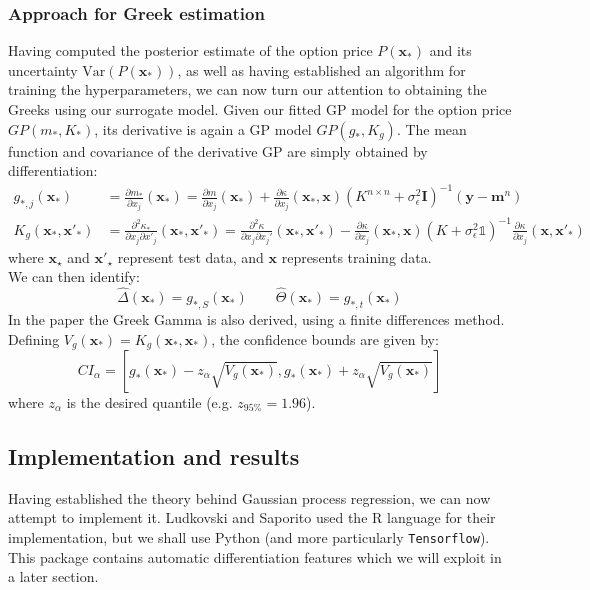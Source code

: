 \documentclass[a4paper,12pt]{article}
\begin{document}
\subsubsection{Approach for Greek estimation}
Having computed the posterior estimate of the option price $P(\mathbf{x}_*)$ and its uncertainty $\text{Var}(P(\mathbf{x}_*))$, as well as having established an algorithm for training the hyperparameters, we can now turn our attention to obtaining the Greeks using our surrogate model. Given our fitted GP model for the option price $GP(m_*,K_*)$, its derivative is again a GP model $GP(g_*,K_g)$. The mean function and covariance of the derivative GP are simply obtained by differentiation: 
\begin{equation}
\label{eq:greek_estimate}
\begin{aligned}
   g_{*,j}(\mathbf{x}_*) &= \frac{\partial m_*}{\partial x_j} (\mathbf{x}_*) = \frac{\partial m}{\partial x_j} (\mathbf{x}_*) + \frac{\partial \kappa}{\partial x_j}(\mathbf{x}_*,\mathbf{x})(K^{n \times n}+\sigma^2_{\epsilon}\textbf{I})^{-1}(\mathbf{y}-\mathbf{m}^n)\\
   K_g(\mathbf{x}_*,\mathbf{x}'_*) &= \frac{\partial^2 \kappa_*}{\partial x_j \partial x'_j}(\mathbf{x_*}, \mathbf{x'_*}) = \frac{\partial^2 \kappa}{\partial x_j \partial x_j'}(\mathbf{x_*}, \mathbf{x'_*}) - \frac{\partial \kappa}{\partial x_j}(\mathbf{x_*}, \mathbf{x})(K + \sigma_\epsilon^2 \mathbb{1})^{-1}\frac{\partial \kappa}{\partial x_j}(\mathbf{x}, \mathbf{x'_*})
\end{aligned}
\end{equation}
where $\mathbf{x_\star}$ and $\mathbf{x'_\star}$ represent test data, and $\mathbf{x}$ represents training data.\\
We can then identify:
$$
    \widehat{\Delta}(\mathbf{x}_*) = g_{*,S}(\mathbf{x}_*) \qquad \widehat{\Theta}(\mathbf{x}_*) = g_{*,t}(\mathbf{x}_*)
$$
In the paper \cite{Ludkovski2020} the Greek Gamma is also derived, using a finite differences method.\\
Defining $V_g(\mathbf{x}_*) =K_g(\mathbf{x}_*,\mathbf{x}_*)$, the confidence bounds are given by:
$$
CI_{\alpha} = \left [g_{*}(\mathbf{x}_*) - z_{\alpha}\sqrt{V_g(\mathbf{x}_*)},g_{*}(\mathbf{x}_*) + z_{\alpha}\sqrt{V_g(\mathbf{x}_*)} \right ]
$$
where $z_{\alpha}$ is the desired quantile (e.g. $z_{95\%}  = 1.96$).


\subsection{Implementation and results}
Having established the theory behind Gaussian process regression, we can now attempt to implement it. Ludkovski and Saporito \cite{Ludkovski2020} used the R language for their implementation, but we shall use Python (and more particularly \texttt{Tensorflow}). This package contains automatic differentiation features which we will exploit in a later section.
\end{document}
